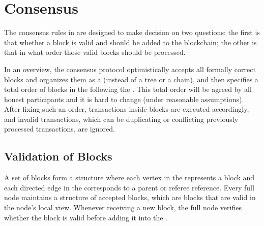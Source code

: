 

\section{Consensus}

The consensus rules in {\name} are designed to make decision on two questions: the first is that whether a block is valid and should be added to the {\name} blockchain; the other is that in what order those valid blocks should be processed.   

In an overview, the \name consensus protocol optimistically accepts all formally correct blocks and organizes them as a \tg (instead of a tree or a chain), and then specifies a total order of blocks in the \tg following the  .
This total order will be agreed by all honest participants and it is hard to change (under reasonable assumptions). 
After fixing such an order, transactions inside blocks are executed accordingly, and invalid transactions, which can be duplicating or conflicting previously processed transactions, are ignored.



\subsection{Validation of Blocks}
\label{sec:block validate}

A set of {\name} blocks form a \tg structure where each vertex in the \tg represents a {\name} block and each directed edge in the \tg corresponds to a parent or referee reference. 
Every full node maintains a \tg structure of accepted blocks, which are blocks that are valid in the node's local view.
Whenever receiving a new block, the full node verifies whether the block is valid before adding it into the \tg.

